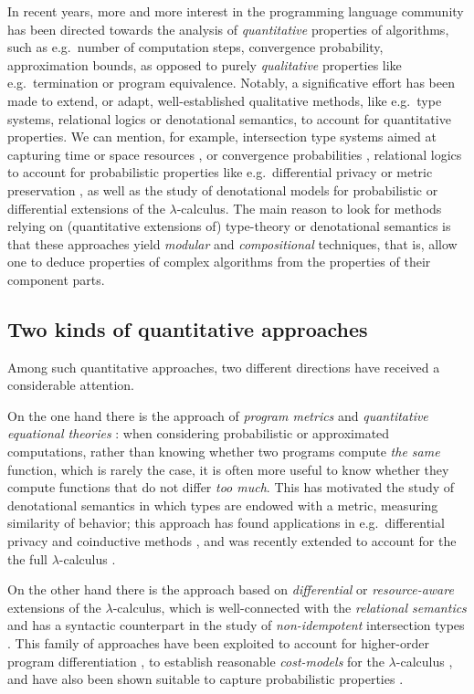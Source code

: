 
In recent years, more and more interest in the programming language community has been directed towards the analysis of \emph{quantitative} properties of algorithms, such as e.g.~number of computation steps, convergence probability, 
approximation bounds, 
as opposed to purely \emph{qualitative} properties like e.g.~termination or program equivalence. 
Notably, a significative effort has been made to extend, or adapt, well-established qualitative methods, like e.g.~type systems, relational logics or denotational semantics, to account for quantitative properties. We can mention, for example, 
intersection type systems aimed at capturing time or space resources \cite{Beniamino}, or convergence probabilities \cite{UgoBreuvart, LICS2022},  relational logics to account for probabilistic properties like e.g.~differential privacy \cite{Barthes} or metric preservation \cite{Reed2010, dallago}, as well as the study of denotational models for 
probabilistic \cite{PCOH, QBS} or differential \cite{difflambda} extensions of the $\lambda$-calculus. 
The main reason to look for methods relying on (quantitative extensions of) type-theory or denotational semantics is that these approaches yield \emph{modular} and \emph{compositional} techniques, that is, allow one to deduce properties of complex algorithms from the properties of their component parts.   

\subsection{Two kinds of quantitative approaches}

Among such quantitative approaches, two different directions have received a considerable attention. 

On the one hand there is the approach of \emph{program metrics} \cite{} and \emph{quantitative equational theories} \cite{Mardare}: when considering probabilistic or approximated computations, rather than knowing whether two programs compute \emph{the same} function, which is rarely the case, it is often more useful to know whether they compute functions that do not differ \emph{too much}. This has motivated the study of denotational semantics in which types are endowed with a metric, measuring similarity of behavior; this approach has found  applications in e.g.~differential privacy \cite{} and coinductive methods \cite{}, and was recently extended to account for the the full $\lambda$-calculus \cite{LICS2021, FSCD2022}.

On the other hand there is the approach based on \emph{differential} or \emph{resource-aware} extensions of the $\lambda$-calculus, which is well-connected with the \emph{relational semantics} \cite{} and has a syntactic counterpart in the study of \emph{non-idempotent} intersection types \cite{}. This family of approaches have been exploited to account for higher-order program differentiation \cite{difflambda}, to establish reasonable \emph{cost-models} for the $\lambda$-calculus \cite{}, and have also been shown suitable to capture probabilistic properties \cite{Manzo}. 


